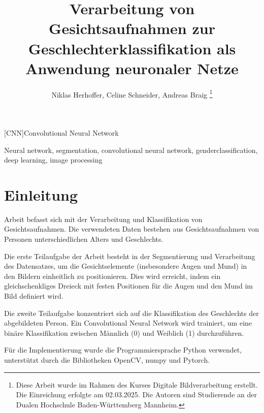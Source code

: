 \documentclass[journal,twoside,web]{ieeecolor}
\begin{document}
\begin{acronym}
    [CNN]{Convolutional Neural Network} 
\end{acronym}

\title{Verarbeitung von Gesichtsaufnahmen zur Geschlechterklassifikation als Anwendung neuronaler Netze}
\author{Niklas Herhoffer, Celine Schneider, Andreas Braig
\thanks{Diese Arbeit wurde im Rahmen des Kurses Digitale Bildverarbeitung erstellt. Die Einreichung erfolgte am 02.03.2025. Die Autoren sind Studierende an der Dualen Hochschule Baden-Württemberg Mannheim.}
}


\maketitle

    


\begin{IEEEkeywords}
    Neural network, segmentation, convolutional neural network, genderclassification, deep learning, image processing
\end{IEEEkeywords}

\section{Einleitung}
\label{sec:introduction}
 Arbeit befasst sich mit der Verarbeitung und Klassifikation von Gesichtsaufnahmen. Die verwendeten Daten bestehen aus Gesichtsaufnahmen von Personen unterschiedlichen Alters und Geschlechts. 

Die erste Teilaufgabe der Arbeit besteht in der Segmentierung und Verarbeitung des Datensatzes, um die Gesichtselemente (insbesondere Augen und Mund) in den Bildern einheitlich zu positionieren. Dies wird erreicht, indem ein gleichschenkliges Dreieck mit festen Positionen für die Augen und den Mund im Bild definiert wird. 

Die zweite Teilaufgabe konzentriert sich auf die Klassifikation des Geschlechts der abgebildeten Person. Ein Convolutional Neural Network wird trainiert, um eine binäre Klassifikation zwischen Männlich (0) und Weiblich (1) durchzuführen.

Für die Implementierung wurde die Programmiersprache Python verwendet, unterstützt durch die Bibliotheken OpenCV, numpy und Pytorch.
\end{document}
